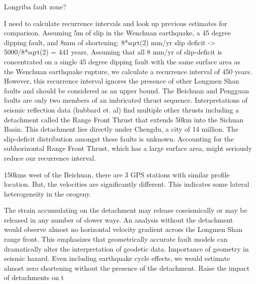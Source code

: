 \documentclass{article}
\begin{document}
Longriba fault zone?

I need to calculate recurrence intervals and look up previous estimates for comparison. 
Assuming 5m of slip in the Wenchuan earthquake, a 45 degree dipping fault, and 8mm of shortening: 8*sqrt(2) mm/yr slip deficit -> 5000/8*sqrt(2) = 441 years.
Assuming that all 8 mm/yr of slip-deficit is concentrated on a single 45 degree dipping fault with the same surface area as the Wenchuan earthquake rupture, we calculate a recurrence interval of 450 years.
However, this recurrence interval ignores the presence of other Longmen Shan faults and should be considered as an upper bound. The Beichuan and Pengguan faults are only two members of an imbricated thrust sequence. Interpretations of seismic reflection data (hubbard et. al) find multiple other thrusts including a detachment called the Range Front Thrust that extends 50km into the Sichuan Basin. This detachment lies directly under Chengdu, a city of 14 million. The slip-deficit distribution amongst these faults is unknown. Accounting for the subhorizontal Range Front Thrust, which has a large surface area, might seriously reduce our recurrence interval.

150kms west of the Beichuan, there are 3 GPS stations with similar profile location. But, the velocities are significantly different. This indicates some lateral heterogeneity in the orogeny.

The strain accumulating on the detachment may release coseismically or may be released in any number of slower ways. 
An analysis without the detachment would observe almost no horizontal velocity gradient across the Longmen Shan range front. This emphasizes that geometrically accurate fault models can dramatically alter the interpretation of geodetic data. 
Importance of geometry in seismic hazard. Even including earthquake cycle effects, we would estimate almost zero shortening without the presence of the detachment. Raise the impact of detachments on t
\end{document}
